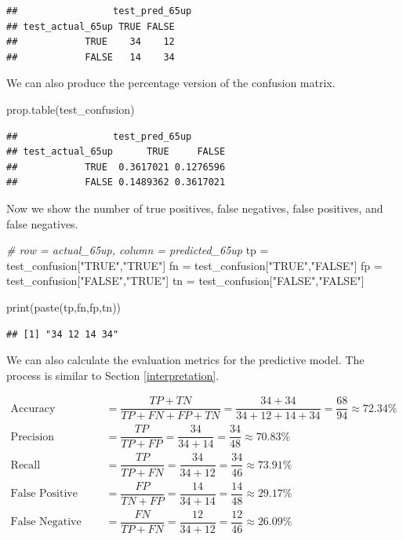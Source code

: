 \documentclass[
]{article}
\newenvironment{Shaded}{\begin{snugshade}}{\end{snugshade}}
\newcommand{\CommentTok}[1]{\textcolor[rgb]{0.56,0.35,0.01}{\textit{#1}}}
\newcommand{\FunctionTok}[1]{\textcolor[rgb]{0.00,0.00,0.00}{#1}}
\newcommand{\NormalTok}[1]{#1}
\newcommand{\OtherTok}[1]{\textcolor[rgb]{0.56,0.35,0.01}{#1}}
\newcommand{\StringTok}[1]{\textcolor[rgb]{0.31,0.60,0.02}{#1}}
\begin{document}
\begin{verbatim}
##                 test_pred_65up
## test_actual_65up TRUE FALSE
##            TRUE    34    12
##            FALSE   14    34
\end{verbatim}

We can also produce the percentage version of the confusion matrix.

\begin{Shaded}
\begin{Highlighting}[]
\FunctionTok{prop.table}\NormalTok{(test\_confusion)}
\end{Highlighting}
\end{Shaded}

\begin{verbatim}
##                 test_pred_65up
## test_actual_65up      TRUE     FALSE
##            TRUE  0.3617021 0.1276596
##            FALSE 0.1489362 0.3617021
\end{verbatim}

Now we show the number of true positives, false negatives, false
positives, and false negatives.

\begin{Shaded}
\begin{Highlighting}[]
\CommentTok{\# row = actual\_65up, column = predicted\_65up}
\NormalTok{tp }\OtherTok{=}\NormalTok{ test\_confusion[}\StringTok{"TRUE"}\NormalTok{,}\StringTok{"TRUE"}\NormalTok{]}
\NormalTok{fn }\OtherTok{=}\NormalTok{ test\_confusion[}\StringTok{"TRUE"}\NormalTok{,}\StringTok{"FALSE"}\NormalTok{]}
\NormalTok{fp }\OtherTok{=}\NormalTok{ test\_confusion[}\StringTok{"FALSE"}\NormalTok{,}\StringTok{"TRUE"}\NormalTok{]}
\NormalTok{tn }\OtherTok{=}\NormalTok{ test\_confusion[}\StringTok{"FALSE"}\NormalTok{,}\StringTok{"FALSE"}\NormalTok{]}

\FunctionTok{print}\NormalTok{(}\FunctionTok{paste}\NormalTok{(tp,fn,fp,tn))}
\end{Highlighting}
\end{Shaded}

\begin{verbatim}
## [1] "34 12 14 34"
\end{verbatim}

We can also calculate the evaluation metrics for the predictive model.
The process is similar to Section \ref{interpretation}.

\begin{align*}
\text{Accuracy} &= \dfrac{TP+TN}{TP+FN+FP+TN} = \dfrac{34+34}{34+12+14+34} = \dfrac{68}{94} \approx 72.34\% \\
\text{Precision} &= \dfrac{TP}{TP+FP} = \dfrac{34}{34+14} = \dfrac{34}{48} \approx 70.83\% \\
\text{Recall} &= \dfrac{TP}{TP+FN} = \dfrac{34}{34+12} = \dfrac{34}{46} \approx 73.91\% \\
\text{False Positive Rate (FPR)} &= \dfrac{FP}{TN+FP} = \dfrac{14}{34+14} = \dfrac{14}{48} \approx 29.17\% \\
\text{False Negative Rate (FNR)} &= \dfrac{FN}{TP+FN} = \dfrac{12}{34+12} = \dfrac{12}{46} \approx 26.09\%
\end{align*}
\end{document}
